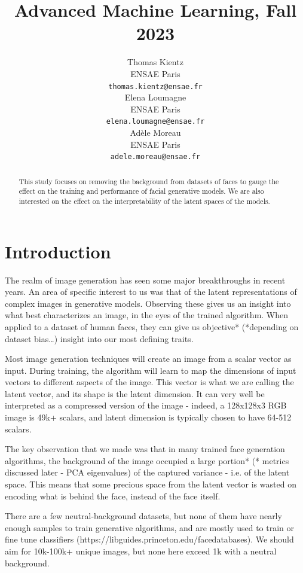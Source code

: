 \documentclass{article}
\title{Advanced Machine Learning, Fall 2023}
\author{%
  Thomas Kientz \\
  ENSAE Paris\\
  \texttt{thomas.kientz@ensae.fr} \\
  \And
  Elena Loumagne \\
  ENSAE Paris\\
  \texttt{elena.loumagne@ensae.fr} \\
  \AND
  Adèle Moreau \\
  ENSAE Paris\\
  \texttt{adele.moreau@ensae.fr} \\
}
\begin{document}
\maketitle

\begin{abstract}
  This study focuses on removing the background from datasets of faces to gauge the effect on the training and performance of facial generative models. We are also interested on the effect on the interpretability of the latent spaces of the models. 
\end{abstract}

\section{Introduction}

\quad The realm of image generation has seen some major breakthroughs in recent years. 
An area of specific interest to us was that of the latent representations of complex images in generative models. 
Observing these gives us an insight into what best characterizes an image, in the eyes of the trained algorithm. 
When applied to a dataset of human faces, they can give us objective* (*depending on dataset bias…) insight into our most defining traits.

Most image generation techniques will create an image from a scalar vector as input. 
During training, the algorithm will learn to map the dimensions of input vectors to different aspects of the image. 
This vector is what we are calling the latent vector, and its shape is the latent dimension. 
It can very well be interpreted as a compressed version of the image - indeed, a 128x128x3 RGB image is 49k+ scalars, and latent dimension is typically chosen to have 64-512 scalars. 

The key observation that we made was that in many trained face generation algorithms, the background of the image occupied a large portion* (* metrics discussed later - PCA eigenvalues) of the captured variance - i.e. of the latent space. 
This means that some precious space from the latent vector is wasted on encoding what is behind the face, instead of the face itself. 

There are a few neutral-background datasets, but none of them have nearly enough samples to train generative algorithms, and are mostly used to train or fine tune classifiers (https://libguides.princeton.edu/facedatabases). 
We should aim for 10k-100k+ unique images, but none here exceed 1k with a neutral background.
\end{document}
